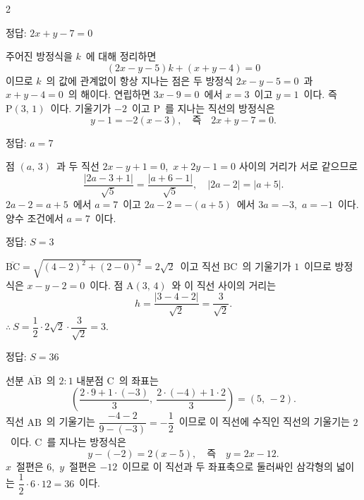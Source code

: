 \documentclass[10pt,fleqn]{article}
\begin{document}
\begin{multicols*}{2}
\begin{dmanswerbox}
정답: $2x+y-7=0$
\end{dmanswerbox}

주어진 방정식을 $k$\ 에 대해 정리하면
\[ (2x - y - 5)k + (x + y - 4) = 0 \]
이므로 $k$\ 의 값에 관계없이 항상 지나는 점은 두 방정식 $2x - y - 5 = 0$\ 과 $x + y - 4 = 0$\ 의 해이다. 연립하면 $3x - 9 = 0$\ 에서 $x = 3$\ 이고 $y = 1$\ 이다. 즉 $\mathrm{P}(3,\, 1)$\ 이다. 기울기가 $-2$\ 이고 $\mathrm{P}$\ 를 지나는 직선의 방정식은
\[ y - 1 = -2(x - 3),\quad \text{즉}\quad 2x + y - 7 = 0. \]

\begin{dmanswerbox}
정답: $a=7$
\end{dmanswerbox}

점 $(a,\, 3)$\ 과 두 직선 $2x - y + 1 = 0$,\ $x + 2y - 1 = 0$ 사이의 거리가 서로 같으므로
\[ \dfrac{|2a - 3 + 1|}{\sqrt{5}} = \dfrac{|a + 6 - 1|}{\sqrt{5}},\quad |2a - 2| = |a + 5|. \]
$2a - 2 = a + 5$\ 에서 $a = 7$\ 이고 $2a - 2 = -(a + 5)$\ 에서 $3a = -3$,\ $a = -1$\ 이다. 양수 조건에서 $a = 7$\ 이다.

\begin{dmanswerbox}
정답: $S=3$
\end{dmanswerbox}

$\overline{\mathrm{BC}} = \sqrt{(4-2)^2 + (2-0)^2} = 2\sqrt{2}$\ 이고 직선 $\mathrm{BC}$\ 의 기울기가 $1$\ 이므로 방정식은 $x - y - 2 = 0$\ 이다. 점 $\mathrm{A}(3,\, 4)$\ 와 이 직선 사이의 거리는
\[ h = \dfrac{|3 - 4 - 2|}{\sqrt{2}} = \dfrac{3}{\sqrt{2}}. \]
$\therefore\ S = \dfrac{1}{2} \cdot 2\sqrt{2} \cdot \dfrac{3}{\sqrt{2}} = 3$.

\begin{dmanswerbox}
정답: $S=36$
\end{dmanswerbox}

선분 $\overline{\mathrm{AB}}$\ 의 $2 : 1$ 내분점 $\mathrm{C}$\ 의 좌표는
\[ \left( \dfrac{2 \cdot 9 + 1 \cdot (-3)}{3},\ \dfrac{2 \cdot (-4) + 1 \cdot 2}{3} \right) = (5,\, -2). \]
직선 $\mathrm{AB}$\ 의 기울기는 $\dfrac{-4-2}{9-(-3)} = -\dfrac{1}{2}$\ 이므로 이 직선에 수직인 직선의 기울기는 $2$\ 이다. $\mathrm{C}$\ 를 지나는 방정식은
\[ y - (-2) = 2(x - 5),\quad \text{즉}\quad y = 2x - 12. \]
$x$\ 절편은 $6$,\ $y$\ 절편은 $-12$\ 이므로 이 직선과 두 좌표축으로 둘러싸인 삼각형의 넓이는 $\dfrac{1}{2} \cdot 6 \cdot 12 = 36$\ 이다.

\end{multicols*}
\end{document}
